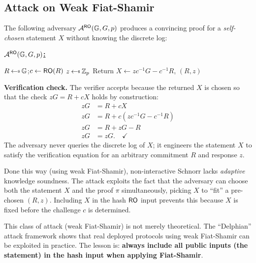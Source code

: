 \documentclass[11pt]{article}
\begin{document}
\subsection{Attack on Weak Fiat-Shamir}

\begin{tcolorbox}[title={Attack on WFSSchnorr (forging a proof without knowing $x$)},
                  colback=red!5, colframe=red!50!black]
The following adversary $\mathcal{A}^{\mathsf{RO}}(\mathbb{G}, G, p)$ produces a convincing proof
for a \emph{self-chosen} statement $X$ without knowing the discrete log:

\medskip
\textbf{\underline{$\mathcal{A}^{\mathsf{RO}}(\mathbb{G}, G, p)$:}}
\begin{algorithmic}[1]
  \State $R \getsr \G$;\quad $c \leftarrow \mathsf{RO}(R)$
  \State $z \getsr \Z_p$
  \State Return $X \leftarrow zc^{-1}G - c^{-1}R$, \quad $(R, z)$
\end{algorithmic}
\end{tcolorbox}

\noindent\textbf{Verification check.}
The verifier accepts because the returned $X$ is chosen so that the check
$zG = R + cX$ holds by construction:
\begin{align*}
  zG &= R + cX \\
  zG &= R + c(zc^{-1}G - c^{-1}R) \\
  zG &= R + zG - R \\
  zG &= zG. \quad\checkmark
\end{align*}
The adversary never queries the discrete log of $X$; it engineers the statement
$X$ to satisfy the verification equation for an arbitrary commitment $R$ and
response $z$.

\begin{remark}
Done this way (using weak Fiat-Shamir), non-interactive Schnorr lacks
\emph{adaptive} knowledge soundness.  The attack exploits the fact that
the adversary can choose both the statement $X$ and the proof $\pi$
simultaneously, picking $X$ to ``fit'' a pre-chosen $(R, z)$.  Including $X$
in the hash $\mathsf{RO}$ input prevents this because $X$ is fixed before the
challenge $c$ is determined.
\end{remark}

\begin{remark}
This class of attack (weak Fiat-Shamir) is not merely theoretical.  The
``Delphian'' attack framework shows that real deployed protocols using weak
Fiat-Shamir can be exploited in practice.  The lesson is: \textbf{always
include all public inputs (the statement) in the hash input when applying
Fiat-Shamir}.
\end{remark}
\end{document}
